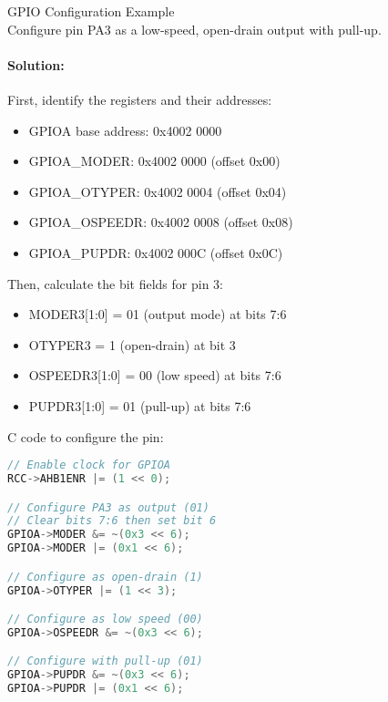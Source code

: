 \begin{example2}{GPIO Configuration Example}\\
Configure pin PA3 as a low-speed, open-drain output with pull-up.

\tcblower
\paragraph{Solution:}
First, identify the registers and their addresses:
\begin{itemize}
    \item GPIOA base address: 0x4002 0000
    \item GPIOA\_MODER: 0x4002 0000 (offset 0x00)
    \item GPIOA\_OTYPER: 0x4002 0004 (offset 0x04)
    \item GPIOA\_OSPEEDR: 0x4002 0008 (offset 0x08)
    \item GPIOA\_PUPDR: 0x4002 000C (offset 0x0C)
\end{itemize}

Then, calculate the bit fields for pin 3:
\begin{itemize}
    \item MODER3[1:0] = 01 (output mode) at bits 7:6
    \item OTYPER3 = 1 (open-drain) at bit 3
    \item OSPEEDR3[1:0] = 00 (low speed) at bits 7:6
    \item PUPDR3[1:0] = 01 (pull-up) at bits 7:6
\end{itemize}

C code to configure the pin:
\begin{lstlisting}[language=C, style=basesmol]
// Enable clock for GPIOA
RCC->AHB1ENR |= (1 << 0);

// Configure PA3 as output (01)
// Clear bits 7:6 then set bit 6
GPIOA->MODER &= ~(0x3 << 6);
GPIOA->MODER |= (0x1 << 6);

// Configure as open-drain (1)
GPIOA->OTYPER |= (1 << 3);

// Configure as low speed (00)
GPIOA->OSPEEDR &= ~(0x3 << 6);

// Configure with pull-up (01)
GPIOA->PUPDR &= ~(0x3 << 6);
GPIOA->PUPDR |= (0x1 << 6);
\end{lstlisting}
\end{example2}

\columnbreak

